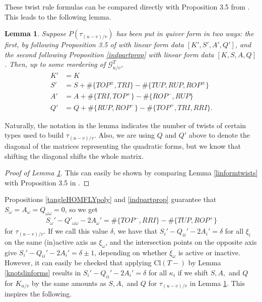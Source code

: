 \documentclass[11pt]{amsart}
\theoremstyle{plain}
\newtheorem{lemmaN}[theoremN]{Lemma}
\theoremstyle{definition}
\theoremstyle{remark}
\begin{document}
These twist rule formulas can be compared directly with Proposition 3.5 from \cite{SW21}. This leads to the following lemma.

\begin{lemmaN}
\label{linformshifts}
    Suppose $P(\tau_{(u-v)/v})$ has been put in quiver form in two ways: the first, by following Proposition 3.5 of \cite{SW21} with linear form data $[K',S',A',Q']$, and the second following Proposition \ref{indpartprop} with linear form data $[K,S,A,Q]$. Then, up to some reordering of $\mathcal{G}_{u/v}^T$,
    \begin{align*}
        K'&=K\\
        S'&= S+\#\{TOP^\pm,TRI\}-\#\{TUP,RUP,ROP^\pm\}\\
        A' &= A+\#\{TRI,TOP^+\}-\#\{ROP^-,RUP\}\\
        Q' &= Q+\#\{RUP,ROP^-\}-\#\{TOP^+,TRI,RRI\}.
    \end{align*}
\end{lemmaN}

Naturally, the notation in the lemma indicates the number of twists of certain types used to build $\tau_{(u-v)/v}$. Also, we are using $Q$ and $Q'$ above to denote the diagonal of the matrices representing the quadratic forms, but we know that shifting the diagonal shifts the whole matrix.

\begin{proof}[Proof of Lemma \ref{linformshifts}]
    This can easily be shown by comparing Lemma \ref{linformtwists} with Proposition 3.5 in \cite{SW21}.
\end{proof}

Propositions \ref{tangleHOMFLYpoly} and \ref{indpartprop} guarantee that $S_\omega=A_\omega=Q_{\omega\omega}=0$, so we get
\begin{align*}
S_\omega'-Q'_{\omega\omega}-2A_\omega'=\#\{TOP^-,RRI\}-\#\{TUP,ROP^+\}
\end{align*}
for $\tau_{(u-v)/v}.$ If we call this value $\delta$, we have that $S_i'-Q_{ii}'-2A_i'=\delta$ for all $\xi_i$ on the same (in)active axis as $\xi_\omega$, and the intersection points on the opposite axis give $S_i'-Q_{ii}'-2A_i'=\delta\pm1$, depending on whether $\xi_\omega$ is active or inactive. However, it can easily be checked that applying $\text{Cl}(T-)$ by Lemma \ref{knotslinforms} results in $S_i'-Q_{ii}'-2A_i'=\delta$ for all $\kappa_i$ if we shift $S,A,$ and $Q$ for $K_{u/v}$ by the same amounts as $S,A,$ and $Q$ for $\tau_{(u-v)/v}$ in Lemma \ref{linformshifts}. This inspires the following.
\end{document}
